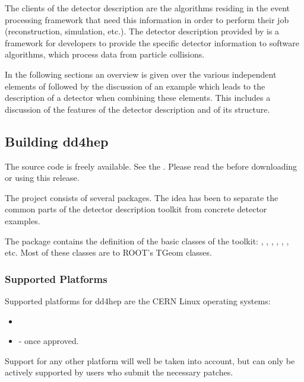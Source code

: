 \documentclass[10pt,a4paper]{article}
\begin{document}
\noindent
The clients of the detector description are the algorithms residing in the 
event processing framework that need this information in order to perform 
their job (reconstruction, simulation, etc.). 
The detector description provided by \DDhep is a framework for developers 
to provide the specific detector information to software algorithms, which 
process data from particle collisions.

\noindent
In the following sections an overview is given over the various independent
elements of \DDhep followed by the discussion of an example which leads to 
the description of a detector when combining these elements.
This includes a discussion of the features of the \DDhep detector description
and of its structure. 

\subsection{Building dd4hep}
\label{sec:dd4hep-user-manual-building}

\noindent
The \DDhep source code is freely available. See the 
.
Please read the  
before downloading or using this release.

\noindent
The \DDhep project consists of several packages. The idea 
has been to separate the common parts of 
the detector description toolkit from concrete detector examples. 

\noindent
The package {} contains the definition of the basic classes 
of the toolkit: , , , ,
, , etc. Most of these classes are  
to ROOT's TGeom classes.

\subsubsection{Supported Platforms}
\label{sec:dd4hep-user-manual-platforms}
\noindent
Supported platforms for dd4hep are the CERN Linux operating systems:
\begin{itemize}
\item {}   
\item {}    - once approved.
\end{itemize}
Support for any other platform will well be taken into account, but can only
be actively supported by users who submit the necessary patches.
\end{document}
